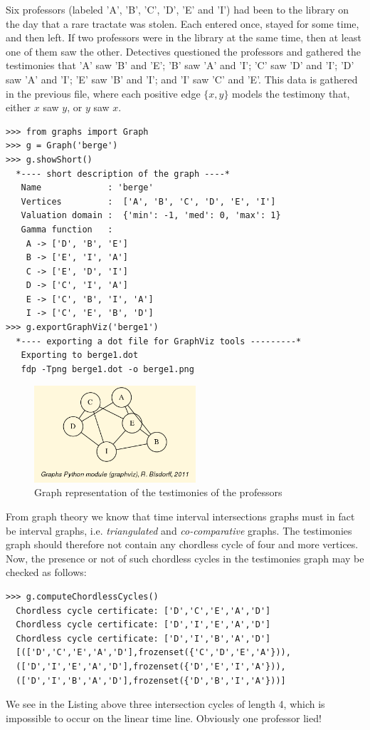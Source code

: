 Six professors (labeled 'A', 'B', 'C', 'D', 'E' and 'I') had been to the library on the day that a rare tractate was stolen. Each entered once, stayed for some time, and then left. If two professors were in the library at the same time, then at least one of them saw the other. Detectives questioned the professors and gathered the testimonies that 'A' saw 'B' and 'E'; 'B' saw 'A' and 'I'; 'C' saw 'D' and 'I'; 'D' saw 'A' and 'I'; 'E' saw 'B' and 'I'; and 'I' saw 'C' and 'E'. This data is gathered in the previous file, where each positive edge $\{x,y\}$ models the testimony that, either $x$ saw $y$, or $y$ saw $x$.
\begin{lstlisting}
>>> from graphs import Graph
>>> g = Graph('berge')
>>> g.showShort()
  *---- short description of the graph ----*
   Name             : 'berge'
   Vertices         :  ['A', 'B', 'C', 'D', 'E', 'I']
   Valuation domain :  {'min': -1, 'med': 0, 'max': 1}
   Gamma function   : 
    A -> ['D', 'B', 'E']
    B -> ['E', 'I', 'A']
    C -> ['E', 'D', 'I']
    D -> ['C', 'I', 'A']
    E -> ['C', 'B', 'I', 'A']
    I -> ['C', 'E', 'B', 'D']
>>> g.exportGraphViz('berge1')
  *---- exporting a dot file for GraphViz tools ---------*
   Exporting to berge1.dot
   fdp -Tpng berge1.dot -o berge1.png
\end{lstlisting}
\begin{figure}[h]
\sidecaption
\includegraphics[width=6cm]{Figures/berge1.png}
\caption{Graph representation of the testimonies of the professors} 
\label{fig:25.2}       %
\end{figure}

From graph theory we know that time interval intersections graphs must in fact be interval graphs, i.e. \emph{triangulated} and \emph{co-comparative} graphs. The testimonies graph should therefore not contain any chordless cycle of four and more vertices. Now, the presence or not of such chordless cycles in the testimonies graph may be checked as follows:
\begin{lstlisting}
>>> g.computeChordlessCycles()
  Chordless cycle certificate: ['D','C','E','A','D']
  Chordless cycle certificate: ['D','I','E','A','D']
  Chordless cycle certificate: ['D','I','B','A','D']
  [(['D','C','E','A','D'],frozenset({'C','D','E','A'})),
  (['D','I','E','A','D'],frozenset({'D','E','I','A'})),
  (['D','I','B','A','D'],frozenset({'D','B','I','A'}))]
\end{lstlisting}
We see in the Listing above three intersection cycles of length 4, which is impossible to occur on the linear time line. Obviously one professor lied!

